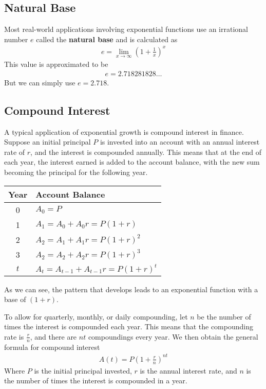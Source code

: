\documentclass[11pt]{article}
\begin{document}
\subsection{Natural Base}

Most real-world applications involving exponential functions use an irrational number $e$ called the \textbf{natural base} and is calculated as
\begin{align*}
    e = \lim_{x \to \infty}\left(1 + \frac{1}{x}\right)^{x}
\end{align*}
This value is approximated to be 
\begin{align*}
    e = 2.718281828\dots
\end{align*}
But we can simply use $e = 2.718$.

\subsection{Compound Interest}

A typical application of exponential growth is compound interest in finance. Suppose an initial principal $P$ is invested into an account with an annual interest rate of $r$, and the interest is compounded annually. This means that at the end of each year, the interest earned is added to the account balance, with the new sum becoming the principal for the following year.

\begin{table}[H]
    \centering
    \begin{tabular}{c|l}
        Year & Account Balance \\
        \hline
        0 & $A_{0} = P$ \\
        1 & $A_{1} = A_{0} + A_{0}r = P(1 + r)$ \\
        2 & $A_{2} = A_{1} + A_{1}r = P(1 + r)^2$ \\
        3 & $A_{2} = A_{2} + A_{2}r = P(1 + r)^3$ \\
        $t$ & $A_{t} = A_{t - 1} + A_{t - 1}r = P(1 + r)^t$
    \end{tabular}
\end{table}
As we can see, the pattern that develops leads to an exponential function with a base of $(1+r)$.

To allow for quarterly, monthly, or daily compounding, let $n$ be the number of times the interest is compounded each year. This means that the compounding rate is $\frac{r}{n}$, and there are $nt$ compoundings every year. We then obtain the general formula for compound interest
\begin{align*}
    A(t) = P\left(1 + \frac{r}{n}\right)^{nt}
\end{align*}
Where $P$ is the initial principal invested, $r$ is the annual interest rate, and $n$ is the number of times the interest is compounded in a year.
\end{document}
